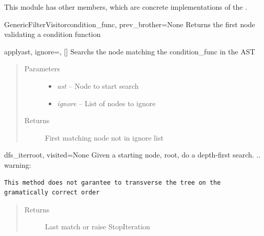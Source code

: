 \documentclass[a4paper,10pt,english]{manual}
\begin{document}
This module has other members, which are concrete implementations of the .
\hypertarget{module-Backends.Common.Visitors.GenericVisitors}{}
\modulesynopsis{}

\hypertarget{Backends.Common.Visitors.GenericVisitors.GenericFilterVisitor}{}\begin{classdesc}{GenericFilterVisitor}{condition\_func, prev\_brother=None}
Returns the first node validating a condition function

\hypertarget{Backends.Common.Visitors.GenericVisitors.GenericFilterVisitor.apply}{}\begin{methoddesc}{apply}{ast, ignore=, {[}{]}}
Searchs the node matching the condition\_func in the AST
\begin{quote}\begin{description}
\item[Parameters] \leavevmode\begin{itemize}
\item {} 
\emph{ast} -- Node to start search

\item {} 
\emph{ignore} -- List of nodes to ignore

\end{itemize}

\item[Returns] \leavevmode
First matching node not in ignore list

\end{description}\end{quote}
\end{methoddesc}

\hypertarget{Backends.Common.Visitors.GenericVisitors.GenericFilterVisitor.dfs\_iter}{}\begin{methoddesc}{dfs\_iter}{root, visited=None}
Given a starting node, root, do a depth-first search. 
.. warning:

\begin{Verbatim}[commandchars=@\[\]]
This method does not garantee to transverse the tree on the gramatically correct order
\end{Verbatim}
\begin{quote}\begin{description}
\item[Returns] \leavevmode
Last match or raise StopIteration


\end{description}
\end{quote}
\end{methoddesc}
\end{classdesc}
\end{document}
